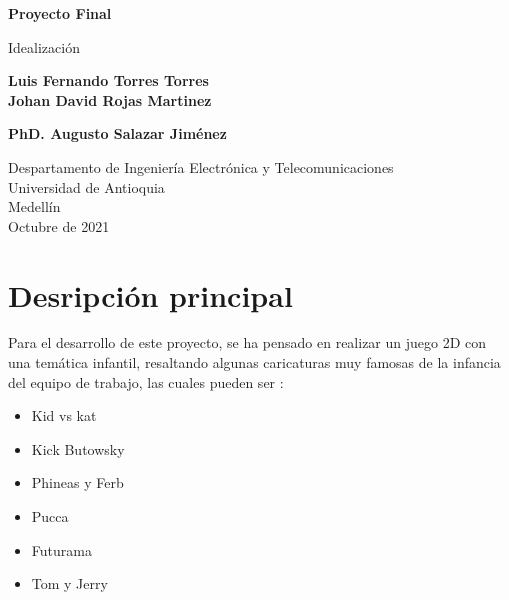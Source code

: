 \documentclass{article}
\begin{document}
\begin{titlepage}
    \begin{center}
        \vspace*{1cm}
            
        \Huge
        \textbf{Proyecto Final}
        
            
        \vspace{0.5cm}
        \LARGE
        Idealización 
            
        \vspace{1.5cm}
            
        \textbf{Luis Fernando Torres Torres\\Johan David Rojas Martinez}
        
        \vspace{4cm}
            
        \textbf{PhD. Augusto Salazar Jiménez}
            
        \vfill
            
        \vspace{0.8cm}
            
        \Large
        Despartamento de Ingeniería Electrónica y Telecomunicaciones\\
        Universidad de Antioquia\\
        Medellín\\
        Octubre de 2021
            
    \end{center}
\end{titlepage}

\tableofcontents%
\newpage

\section{Desripción principal}\label{Descripcion}
Para el desarrollo de este proyecto, se ha pensado en realizar un juego 2D con una temática infantil, resaltando algunas caricaturas muy famosas de la infancia del equipo de trabajo, las cuales pueden ser :

\begin{itemize}
\item Kid vs kat
\item Kick Butowsky
\item Phineas y Ferb 
\item Pucca 
\item Futurama
\item Tom y Jerry
\end{itemize}
\end{document}
